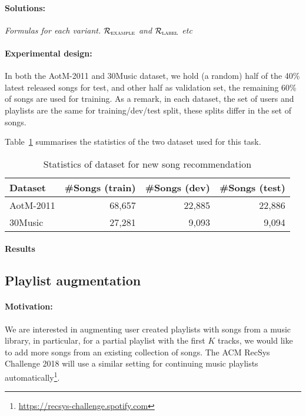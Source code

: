 

\paragraph{Solutions:}
{\it Formulas for each variant. $\mathcal{R}_\textsc{example}$ and $\mathcal{R}_\textsc{label}$ etc}


\paragraph{Experimental design:}
In both the AotM-2011 and 30Music dataset, we hold (a random) half of the 40\% latest released songs for test,
and other half as validation set, the remaining 60\% of songs are used for training.
As a remark, in each dataset, the set of users and playlists are the same for training/dev/test split,
these splits differ in the set of songs.

Table~\ref{tab:stats_newsongrec} summarises the statistics of the two dataset used for this task.

\begin{table}[!h]
\centering
\caption{Statistics of dataset for new song recommendation}
\label{tab:stats_newsongrec}
\small
\begin{tabular}{l|rrr}
\toprule
Dataset   & \#Songs (train) & \#Songs (dev) & \#Songs (test) \\
\midrule
AotM-2011 & 68,657          & 22,885        & 22,886 \\
30Music   & 27,281          & 9,093         & 9,094  \\
\bottomrule
\end{tabular}
\end{table}

\paragraph{Results}



\subsection{Playlist augmentation}
\label{ssec:pla}

\paragraph{Motivation:}
We are interested in augmenting user created playlists with songs from a music library,
in particular, for a partial playlist with the first $K$ tracks, 
we would like to add more songs from an existing collection of songs.
The ACM RecSys Challenge 2018 will use a similar setting for continuing music playlists 
automatically\footnote{\url{https://recsys-challenge.spotify.com}}.

